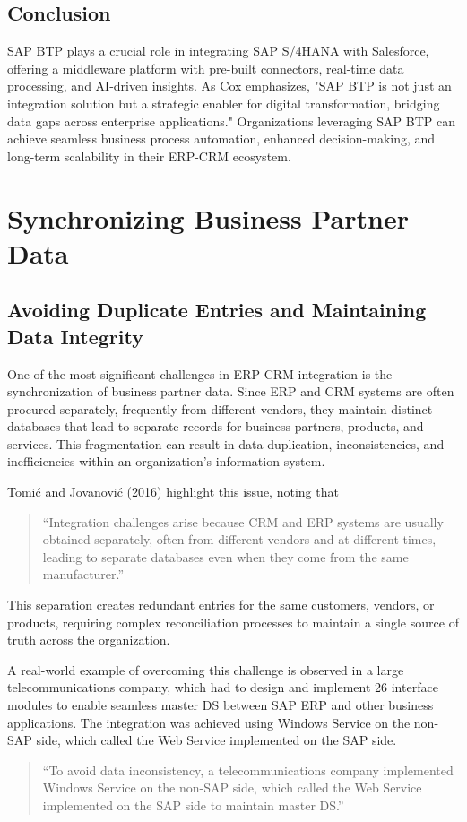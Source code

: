 \subsection{Conclusion}

SAP BTP plays a crucial role in integrating SAP S/4HANA with Salesforce, offering a middleware platform with pre-built connectors, real-time data processing, and AI-driven insights. As Cox \cite{sap2020} emphasizes, "SAP BTP is not just an integration solution but a strategic enabler for digital transformation, bridging data gaps across enterprise applications." Organizations leveraging SAP BTP can achieve seamless business process automation, enhanced decision-making, and long-term scalability in their ERP-CRM ecosystem.


\section{Synchronizing Business Partner Data}
\subsection{Avoiding Duplicate Entries and Maintaining Data Integrity}

One of the most significant challenges in ERP-CRM integration is the synchronization of business partner data. Since ERP and CRM systems are often procured separately, frequently from different vendors, they maintain distinct databases that lead to separate records for business partners, products, and services. This fragmentation can result in data duplication, inconsistencies, and inefficiencies within an organization's information system.

Tomić and Jovanović (2016) highlight this issue, noting that 
\begin{quote}
    ``Integration challenges arise because CRM and ERP systems are usually obtained separately, often from different vendors and at different times, leading to separate databases even when they come from the same manufacturer.'' \cite{tomic2016}
\end{quote}
This separation creates redundant entries for the same customers, vendors, or products, requiring complex reconciliation processes to maintain a single source of truth across the organization.

A real-world example of overcoming this challenge is observed in a large telecommunications company, which had to design and implement 26 interface modules to enable seamless master DS between SAP ERP and other business applications. The integration was achieved using Windows Service on the non-SAP side, which called the Web Service implemented on the SAP side. 
\begin{quote}
    ``To avoid data inconsistency, a telecommunications company implemented Windows Service on the non-SAP side, which called the Web Service implemented on the SAP side to maintain master DS.'' \cite{tomic2016}
\end{quote}

